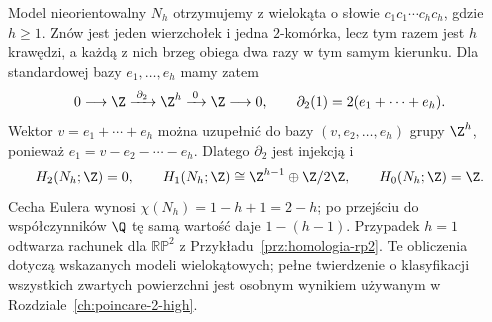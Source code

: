 Model nieorientowalny $N_h$ otrzymujemy z wielokąta o słowie
$c_1c_1\cdots c_hc_h$, gdzie $h\geq1$.
Znów jest jeden wierzchołek i jedna $2$-komórka, lecz tym razem
jest $h$ krawędzi, a każdą z nich brzeg obiega dwa razy w tym samym
kierunku. Dla standardowej bazy $e_1,\ldots,e_h$ mamy zatem
\[
 0\longrightarrow\Z\xrightarrow{\;\partial_2\;}\Z^h
 \xrightarrow{\;0\;}\Z\longrightarrow0,
 \qquad \partial_2(1)=2(e_1+\cdots+e_h).
\]
Wektor $v=e_1+\cdots+e_h$ można uzupełnić do bazy
$(v,e_2,\ldots,e_h)$ grupy $\Z^h$, ponieważ
$e_1=v-e_2-\cdots-e_h$.
Dlatego $\partial_2$ jest injekcją i
\[
 H_2(N_h;\Z)=0,\qquad
 H_1(N_h;\Z)\cong\Z^{h-1}\oplus\Z/2\Z,\qquad
 H_0(N_h;\Z)=\Z.
\]
Cecha Eulera wynosi $\chi(N_h)=1-h+1=2-h$;
po przejściu do współczynników $\Q$ tę samą wartość daje
$1-(h-1)$. Przypadek $h=1$ odtwarza rachunek dla
$\mathbb{RP}^2$ z Przykładu~\ref{prz:homologia-rp2}.
Te obliczenia dotyczą wskazanych modeli wielokątowych; pełne
twierdzenie o klasyfikacji wszystkich zwartych powierzchni
jest osobnym wynikiem używanym w Rozdziale~\ref{ch:poincare-2-high}.
